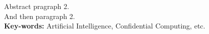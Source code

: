 Abstract pragraph 2. \\

And then paragraph 2. \\ 

\noindent\textbf{Key-words:} Artificial Intelligence, Confidential Computing, etc.

\newpage